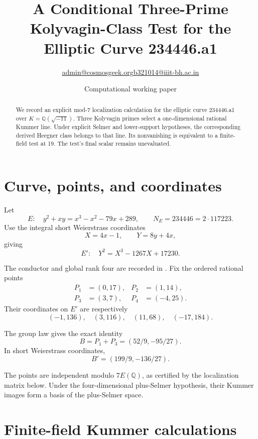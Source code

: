 \documentclass[11pt]{article}
\begin{document}
\title{A Conditional Three-Prime Kolyvagin-Class Test
for the Elliptic Curve 234446.a1}
\author{\small \href{mailto:admin@cosmosgeek.org}{admin@cosmosgeek.org}\qquad \href{mailto:b321014@iiit-bh.ac.in}{b321014@iiit-bh.ac.in}}
\date{Computational working paper}
\maketitle

\begin{abstract}
We record an explicit mod-$7$ localization calculation
for the elliptic curve 234446.a1 over
$K=\mathbb Q(\sqrt{-11})$. Three Kolyvagin primes
select a one-dimensional rational Kummer line.
Under explicit Selmer and lower-support hypotheses,
the corresponding derived Heegner class belongs to that line.
Its nonvanishing is equivalent to a finite-field test at 19.
The test's final scalar remains unevaluated.
\end{abstract}

\section{Curve, points, and coordinates}

Let
\[
 E:\quad y^2+xy=x^3-x^2-79x+289,
 \qquad N_E=234446=2\cdot117223.
\]
Use the integral short Weierstrass coordinates
\[
 X=4x-1,\qquad Y=8y+4x,
\]
giving
\[
 E':\quad Y^2=X^3-1267X+17230.
\]

The conductor and global rank four are recorded in \cite{LMFDB}.
Fix the ordered rational points
\[
\begin{aligned}
 P_1&=(0,17),&
 P_2&=(1,14),\\
 P_3&=(3,7),&
 P_4&=(-4,25).
\end{aligned}
\]
Their coordinates on $E'$ are respectively
\[
 (-1,136),\quad(3,116),\quad
 (11,68),\quad(-17,184).
\]

The group law gives the exact identity
\[
 \boxed{
 B=P_1+P_3=(52/9,-95/27).
 }
\]
In short Weierstrass coordinates,
\[
 B'=(199/9,-136/27).
\]

The points are independent modulo
$7E(\mathbb Q)$, as certified by the localization
matrix below. Under the four-dimensional
plus-Selmer hypothesis, their Kummer images
form a basis of the plus-Selmer space.

\section{Finite-field Kummer calculations}
\end{document}
